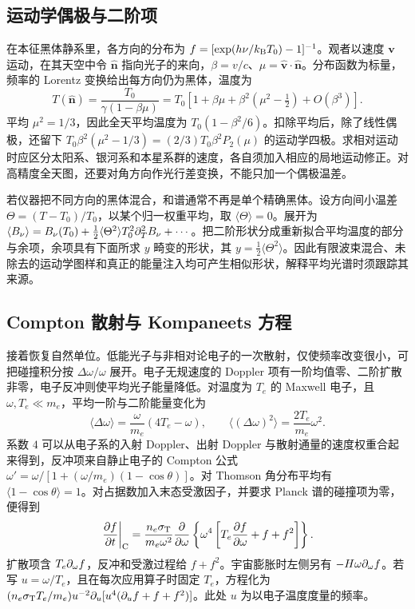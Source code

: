 \subsection{运动学偶极与二阶项}

在本征黑体静系里，各方向的分布为 $f=[\exp(h\nu/k_{\rm B}T_0)-1]^{-1}$。观者以速度 $\bm v$ 运动，在其天空中令 $\hat{\bm n}$ 指向光子的来向，$\beta=v/c$、$\mu=\hat{\bm v}\cdot\hat{\bm n}$。分布函数为标量，频率的 Lorentz 变换给出每方向仍为黑体，温度为
\[
 T(\hat{\bm n})=\frac{T_0}{\gamma(1-\beta\mu)}
 =T_0\left[1+\beta\mu+\beta^2(\mu^2-\tfrac12)+O(\beta^3)\right].
\]
平均 $\mu^2=1/3$，因此全天平均温度为 $T_0(1-\beta^2/6)$。扣除平均后，除了线性偶极，还留下 $T_0\beta^2(\mu^2-1/3)=(2/3)T_0\beta^2P_2(\mu)$ 的运动学四极。求相对运动时应区分太阳系、银河系和本星系群的速度，各自须加入相应的局地运动修正。对高精度全天图，还要对角方向作光行差变换，不能只加一个偶极温差。

若仪器把不同方向的黑体混合，和谱通常不再是单个精确黑体。设方向间小温差 $\Theta=(T-T_0)/T_0$，以某个归一权重平均，取 $\langle\Theta\rangle=0$。展开为 $\langle B_\nu\rangle=B_\nu(T_0)+\tfrac12\langle\Theta^2\rangle T_0^2\partial_T^2B_\nu+\cdots$。把二阶形状分成重新拟合平均温度的部分与余项，余项具有下面所求 $y$ 畸变的形状，其 $y=\tfrac12\langle\Theta^2\rangle$。因此有限波束混合、未除去的运动学图样和真正的能量注入均可产生相似形状，解释平均光谱时须跟踪其来源。

\subsection{Compton 散射与 Kompaneets 方程}

接着恢复自然单位。低能光子与非相对论电子的一次散射，仅使频率改变很小，可把碰撞积分按 $\Delta\omega/\omega$ 展开。电子无规速度的 Doppler 项有一阶均值零、二阶扩散非零，电子反冲则使平均光子能量降低。对温度为 $T_e$ 的 Maxwell 电子，且 $\omega,T_e\ll m_e$，平均一阶与二阶能量变化为
\[
 \langle\Delta\omega\rangle=
 \frac{\omega}{m_e}(4T_e-\omega),\qquad
 \langle(\Delta\omega)^2\rangle=\frac{2T_e}{m_e}\omega^2 .
\]
系数 $4$ 可以从电子系的入射 Doppler、出射 Doppler 与散射通量的速度权重合起来得到，反冲项来自静止电子的 Compton 公式 $\omega'=\omega/[1+(\omega/m_e)(1-\cos\theta)]$。对 Thomson 角分布平均有 $\langle1-\cos\theta\rangle=1$。对占据数加入末态受激因子，并要求 Planck 谱的碰撞项为零，便得到
\begin{equation}\label{eq:cosmo-kompaneets}
 \left.\frac{\partial f}{\partial t}\right|_{\rm C}
 =\frac{n_e\sigma_{\rm T}}{m_e\omega^2}
 \frac{\partial}{\partial\omega}
 \left\{\omega^4\left[T_e\frac{\partial f}{\partial\omega}+f+f^2\right]\right\}.
\end{equation}
扩散项含 $T_e\partial_\omega f$，反冲和受激过程给 $f+f^2$。宇宙膨胀时左侧另有 $-H\omega\partial_\omega f$。若写 $u=\omega/T_e$，且在每次应用算子时固定 $T_e$，方程化为 $(n_e\sigma_{\rm T}T_e/m_e)u^{-2}\partial_u[u^4(\partial_uf+f+f^2)]$。此处 $u$ 为以电子温度度量的频率。

